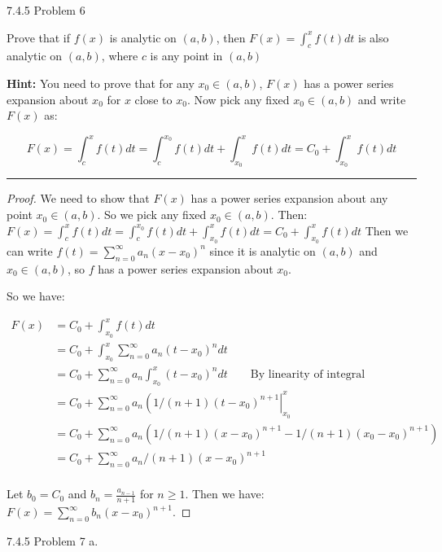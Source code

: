 \documentclass[11pt]{article}
\begin{document}
 7.4.5 Problem 6

Prove that if $f(x)$ is analytic on $(a,b)$, then $F(x) = \int_c ^x f(t)dt$ 
is also analytic on $(a,b)$, where $c$ is any point in $(a,b)$

\textbf{Hint:} You need to prove that for any $x_0 \in (a,b)$, $F(x)$ has
a power series expansion about $x_0$ for $x$ close to $x_0$.
Now pick any fixed $x_0 \in (a,b)$ and write $F(x)$ as:

$$F(x) = \int_c ^x f(t) dt = \int_c ^{x_0} f(t) dt + \int_{x_0} ^x f(t) dt = C_0 + \int_{x_0} ^x f(t)dt$$

\hrule

\begin{proof}
    
    We need to show that $F(x)$ has a power series expansion about any point $x_0 \in (a,b)$.
    So we pick any fixed $x_0 \in (a,b)$.
    Then: $F(x) = \int_c ^x f(t) dt = \int_c ^{x_0} f(t) dt + \int_{x_0} ^x f(t) dt = C_0 + \int_{x_0} ^x f(t)dt$
    Then we can write $f(t) = \sum_{n=0} ^\infty a_n (x-x_0)^n$
    since it is analytic on $(a,b)$ and $x_0 \in (a,b)$, so $f$ has a power series expansion about $x_0$.

    So we have:

    \begin{align*}
        F(x) &= C_0 + \int_{x_0} ^x f(t)dt\\
        &= C_0 + \int_{x_0} ^x \sum_{n=0} ^\infty a_n (t-x_0)^n dt\\
        &= C_0 + \sum_{n=0} ^\infty a_n \int_{x_0} ^x  (t-x_0)^n dt \quad \quad \text{By linearity of integral}\\
        &= C_0 + \sum_{n=0} ^\infty  a_n \left(  1/(n+1) (t-x_0)^{n+1} \right| _{x_0}^x\\
        &= C_0 + \sum_{n=0} ^\infty  a_n \left(  1/(n+1) (x-x_0)^{n+1} - 1/(n+1) (x_0-x_0)^{n+1}\right)\\
        &= C_0 + \sum_{n=0} ^\infty  a_n/(n+1) (x-x_0)^{n+1}\\
    \end{align*}

    Let $b_0 = C_0$ and $b_n = \frac{a_{n-1}}{n+1}$ for $n \geq 1$. Then we have:
    $F(x) = \sum_{n=0} ^\infty b_n (x-x_0)^{n+1}$. 

\end{proof}








 7.4.5 Problem 7 a.
\end{document}
